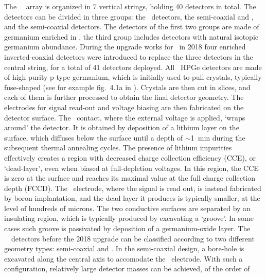 The \gerda\ \phasetwo\ array is organized in 7 vertical strings, holding 40 detectors in
total. The detectors can be divided in three groups: the \bege\ detectors, the
semi-coaxial  and , and the semi-coaxial  detectors. The detectors of
the first two groups are made of germanium enriched in \gesix, the third group includes
detectors with natural isotopic germanium abundance. During the upgrade works for
\phasetwop\ in 2018 four enriched inverted-coaxial \IC{} detectors were introduced to
replace the three \GTF{} detectors in the central string, for a total of 41 detectors
deployed.
\newpar
All \gerda\ HPGe detectors are made of high-purity p-type germanium, which is initially
used to pull crystals, typically fuse-shaped (see for example fig.~4.1a in
\cite{Yonenaga2019}).  Crystals are then cut in slices, and each of them is further
processed to obtain the final detector geometry. The electrodes for signal read-out and
voltage biasing are then fabricated on the detector surface. The \nplus\ contact, where the
external voltage is applied, `wraps around' the detector. It is obtained by deposition of
a lithium layer on the surface, which diffuses below the surface until a depth of
$\sim$1~mm during the subsequent thermal annealing cycles. The presence of lithium
impurities effectively creates a region with decreased charge collection efficiency (CCE),
or `dead-layer', even when biased at full-depletion voltages.  In this region, the CCE is
zero at the surface and reaches its maximal value at the full charge collection depth
(FCCD). The \pplus\ electrode, where the signal is read out, is instead fabricated by boron
implantation, and the dead layer it produces is typically smaller, at the level of
hundreds of microns. The two conductive surfaces are separated by an insulating region,
which is typically produced by excavating a `groove'. In some cases such groove is
passivated by deposition of a germanium-oxide layer.
\newpar
{}
The \gerda\ \phasetwo\ detectors before the 2018 upgrade can be classified according to
two different geometry types: semi-coaxial and \bege. In the semi-coaxial design, a
bore-hole is excavated along the central axis to accomodate the \pplus\ electrode. With
such a configuration, relatively large detector masses can be achieved, of the order of
